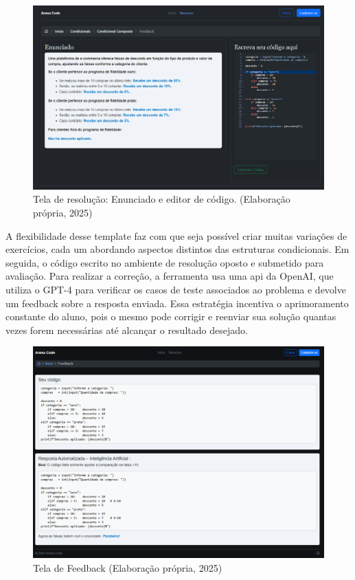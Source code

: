 \begin{figure}[H]
  \centering
  \includegraphics[width=\textwidth]{./imagens/capitulo7/ferramenta-fig2}
  \caption{Tela de resolução: Enunciado e editor de código.  (Elaboração própria, 2025)}\label{fig:ferramenta-enunciado}
\end{figure}

A flexibilidade desse template faz com que seja possível criar muitas variações de exercícios, cada um abordando aspectos distintos das estruturas condicionais. Em seguida, o código escrito no ambiente de resolução oposto e submetido para avaliação. Para realizar a correção, a ferramenta usa uma \gls{api} da OpenAI, que utiliza o GPT-4 para verificar os casos de teste associados ao problema e devolve um feedback  sobre a resposta enviada. Essa estratégia incentiva o aprimoramento constante do aluno, pois o mesmo pode corrigir e reenviar sua solução quantas vezes forem necessárias até alcançar o resultado desejado. 

\begin{figure}[ht]
	\centering
	\includegraphics[width=14cm]{./imagens/capitulo7/ferramenta-fig3}
	\caption{Tela de Feedback (Elaboração própria, 2025) }
	\label{fig:ferramenta-fedback}
\end{figure}


